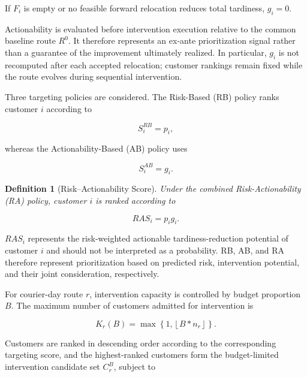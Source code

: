 \documentclass[11pt,a4paper]{article}
\newtheorem{definition}{Definition}
\begin{document}
If \(F_{i}\) is empty or no feasible forward relocation reduces total
tardiness, \(g_{i} = 0\).

Actionability is evaluated before intervention execution relative to the
common baseline route \(R^{0}\). It therefore represents an ex-ante
prioritization signal rather than a guarantee of the improvement
ultimately realized. In particular, \(g_{i}\) is not recomputed after
each accepted relocation; customer rankings remain fixed while the route
evolves during sequential intervention.

Three targeting policies are considered. The Risk-Based (RB) policy
ranks customer \(i\) according to

\begin{equation}
S_{i}^{RB} = p_{i},
\label{eq:10}
\end{equation}

whereas the Actionability-Based (AB) policy uses

\begin{equation}
S_{i}^{AB} = g_{i}.
\label{eq:11}
\end{equation}

\begin{definition}[Risk--Actionability Score]
Under the combined Risk-Actionability (RA) policy, customer \(i\) is ranked
according to

\begin{equation}
RAS_{i} = p_{i}g_{i}.
\label{eq:12}
\end{equation}
\end{definition}

\(RAS_{i}\) represents the risk-weighted actionable tardiness-reduction
potential of customer \(i\) and should not be interpreted as a
probability. RB, AB, and RA therefore represent prioritization based on
predicted risk, intervention potential, and their joint consideration,
respectively.

For courier-day route \(r\), intervention capacity is controlled by
budget proportion \(B\). The maximum number of customers admitted for
intervention is

\begin{equation}
K_{r}(B) = \max\left\{ 1,\left\lfloor B*n_{r} \right\rfloor \right\}.
\label{eq:13}
\end{equation}

Customers are ranked in descending order according to the corresponding
targeting score, and the highest-ranked customers form the
budget-limited intervention candidate set \(C_{r}^{B}\), subject to
\end{document}

